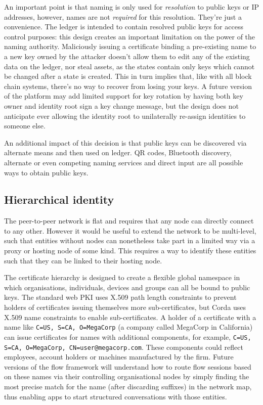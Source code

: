 \documentclass{article}
\begin{document}
An important point is that naming is only used for \emph{resolution} to public keys or IP addresses, however, names
are not \emph{required} for this resolution. They're just a convenience. The ledger is intended to contain resolved
public keys for access control purposes: this design creates an important limitation on the power of the naming
authority. Maliciously issuing a certificate binding a pre-existing name to a new key owned by the attacker doesn't
allow them to edit any of the existing data on the ledger, nor steal assets, as the states contain only keys which
cannot be changed after a state is created. This in turn implies that, like with all block chain systems, there's
no way to recover from losing your keys. A future version of the platform may add limited support for key rotation
by having both key owner and identity root sign a key change message, but the design does not anticipate ever
allowing the identity root to unilaterally re-assign identities to someone else.

An additional impact of this decision is that public keys can be discovered via alternate means and then used on
ledger. QR codes, Bluetooth discovery, alternate or even competing naming services and direct input are all
possible ways to obtain public keys.

\subsection{Hierarchical identity}\label{subsec:hierarchical-identity}

The peer-to-peer network is flat and requires that any node can directly connect to any other. However it would be
useful to extend the network to be multi-level, such that entities without nodes can nonetheless take part in a
limited way via a proxy or hosting node of some kind. This requires a way to identify these entities such that they
can be linked to their hosting node.

The certificate hierarchy is designed to create a flexible global namespace in which organisations, individuals,
devices and groups can all be bound to public keys. The standard web PKI uses X.509 path length constraints to
prevent holders of certificates issuing themselves more sub-certificates, but Corda uses X.509 name constraints to
enable sub-certificates. A holder of a certificate with a name like \texttt{C=US, S=CA, O=MegaCorp} (a company
called MegaCorp in California) can issue certificates for names with additional components, for example,
\texttt{C=US, S=CA, O=MegaCorp, CN=user@megacorp.com}. These components could reflect employees, account holders or
machines manufactured by the firm. Future versions of the flow framework will understand how to route flow sessions
based on these names via their controlling organisational nodes by simply finding the most precise match for the
name (after discarding suffixes) in the network map, thus enabling apps to start structured conversations with
those entities.
\end{document}
